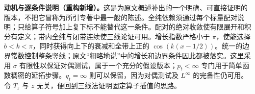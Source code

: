 \documentclass[../../main.tex]{subfiles}
\begin{document}
\begin{remark}
\textbf{动机与逐条件说明（重构新增）。}这是为原文概述补出的一个明确、可直接证明的版本，不把它冒称为所引专著中最一般的陈述。全纯依赖须通过每个标量配对说明；只给算子符号加上复下标不能替代这一条件。配对的绝对收敛使有限展开和积分有定义；带内全纯与闭带连续使三线论证可用。增长指数严格小于 $\pi$，使能选择 $b<k<\pi$，同时获得向上下的衰减和全带上正的 $\cos(k(x-1/2))$。统一的边界常数控制整条竖线；原文“粗略地说”中的增长和边界条件因此都被落实。这里采用 $\sigma$ 有限性以保证对偶测试，属于一个充分的假设版本；$p_t<\infty$ 专门用于简单函数稠密的延拓步骤。$q_t=\infty$ 则可以保留，因为对偶测试及 $L^\infty$ 的完备性仍可用。令 $T_z$ 与 $z$ 无关，便回到三线法证明固定算子插值的思路。
\end{remark}
\end{document}
